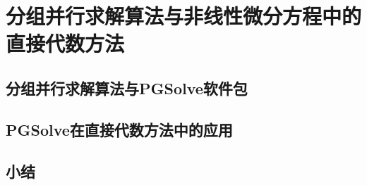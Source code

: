 \chapter{分组并行求解算法与非线性微分方程中的直接代数方法}\label{ch03}
\section{分组并行求解算法与PGSolve软件包}
\section{PGSolve在直接代数方法中的应用}
\section{小结}
